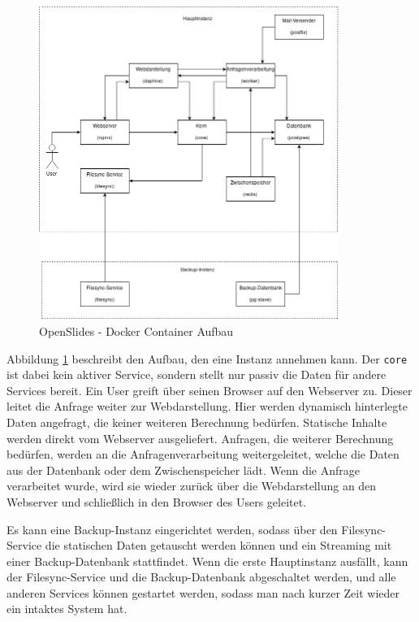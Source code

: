 \documentclass[11pt,a4paper]{article}
\begin{document}
\begin{figure}[htp]
	\centering
	\includegraphics[width=0.87\textwidth]{img/dock_cont.png}
	\caption[OpenSlides - Docker Container Aufbau]{OpenSlides - Docker 
		Container Aufbau}
	\label{fig:osdockcont}
\end{figure}

Abbildung \ref{fig:osdockcont} beschreibt den Aufbau, den eine Instanz annehmen 
kann. Der \texttt{core} ist dabei kein aktiver Service, sondern stellt nur 
passiv die Daten für andere Services bereit. Ein User greift über seinen 
Browser auf den Webserver zu. Dieser leitet die Anfrage weiter zur 
Webdarstellung. Hier werden dynamisch hinterlegte Daten angefragt, die keiner 
weiteren Berechnung bedürfen. Statische Inhalte werden direkt vom Webserver 
ausgeliefert. Anfragen, die weiterer Berechnung bedürfen, werden an die 
Anfragenverarbeitung weitergeleitet, welche die Daten aus der Datenbank oder 
dem Zwischenspeicher lädt. Wenn die Anfrage verarbeitet wurde, wird sie wieder 
zurück über die Webdarstellung an den Webserver und schließlich in den Browser 
des Users geleitet.

Es kann eine Backup-Instanz eingerichtet werden, sodass über den 
Filesync-Service die statischen Daten getauscht werden können und ein Streaming 
mit einer Backup-Datenbank stattfindet. Wenn die erste Hauptinstanz ausfällt, 
kann der Filesync-Service und die Backup-Datenbank abgeschaltet werden, und alle 
anderen Services können gestartet werden, sodass man nach kurzer Zeit wieder 
ein intaktes System hat.
\end{document}
